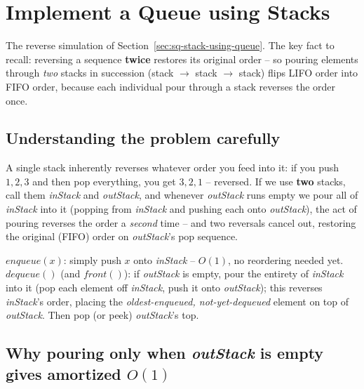 \section{Implement a Queue using Stacks}
\label{sec:sq-queue-using-stack}


\begin{patternbox}
The reverse simulation of Section~\ref{sec:sq-stack-using-queue}. The key
fact to recall: reversing a sequence \textbf{twice} restores its original
order -- so pouring elements through \emph{two} stacks in succession
(stack $\to$ stack $\to$ stack) flips LIFO order into FIFO order, because
each individual pour through a stack reverses the order once.
\end{patternbox}

\subsection*{Understanding the problem carefully}

A single stack inherently reverses whatever order you feed into it: if
you push $1,2,3$ and then pop everything, you get $3,2,1$ -- reversed. If
we use \textbf{two} stacks, call them \textit{inStack} and
\textit{outStack}, and whenever \textit{outStack} runs empty we pour all
of \textit{inStack} into it (popping from \textit{inStack} and pushing
each onto \textit{outStack}), the act of pouring reverses the order a
\emph{second} time -- and two reversals cancel out, restoring the
original (FIFO) order on \textit{outStack}'s pop sequence.

\begin{ideabox}
$\textit{enqueue}(x)$: simply push $x$ onto \textit{inStack} -- $O(1)$,
no reordering needed yet. $\textit{dequeue}()$ (and $\textit{front}()$):
if \textit{outStack} is empty, pour the entirety of \textit{inStack} into
it (pop each element off \textit{inStack}, push it onto \textit{outStack});
this reverses \textit{inStack}'s order, placing the
\emph{oldest-enqueued, not-yet-dequeued} element on top of
\textit{outStack}. Then pop (or peek) \textit{outStack}'s top.
\end{ideabox}

\subsection*{Why pouring only when \textit{outStack} is empty gives amortized $O(1)$}

